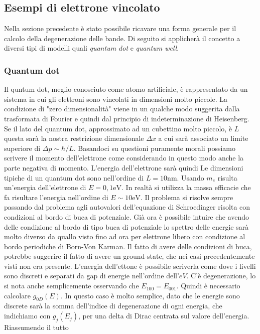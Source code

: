 \documentclass[a4paper,12pt]{article}
\begin{document}
\subsection{Esempi di elettrone vincolato}
Nella sezione precedente è stato possibile ricavare una forma generale per il calcolo della degenerazione delle bande. Di seguito si applicherà il concetto a diversi tipi di modelli quali \textit{quantum dot} e \textit{quantum well}.
\subsubsection{Quantum dot}
Il quntum dot, meglio conosciuto come atomo artificiale, è rappresentato da un sistema in cui gli elettroni sono vincolati in dimensioni molto piccole. La condizione di "zero dimensionalità" viene in un qualche modo suggerita dalla trasformata di Fourier e quindi dal principio di indeterminazione di Heisenberg. Se il lato del quantum dot, approssimato ad un cubettino molto piccolo, è $L$ questa sarà la nostra restrizione dimensionale $\Delta x$ a cui sarà associato un limite superiore di $\Delta p \sim \hbar/L$. Basandoci su questioni puramente morali possiamo scrivere il momento dell'elettrone come 
considerando in questo modo anche la parte negativa di momento. L'energia dell'elettrone sarà quindi
Le dimensioni tipiche di un quantum dot sono nell'ordine di $L=10\text{nm}$. Usando $m_e$ risulta un'energia dell'elettrone di $E=0,1\text{eV}$. In realtà si utilizza la massa efficacie che fa risultare l'energia nell'ordine di $E\sim 10 \text{eV}$. Il problema si risolve sempre passando dal problema agli autovalori dell'equazione di Schroedinger risolta con condizioni al bordo di buca di potenziale. Già ora è possibile intuire che avendo delle condizione al bordo di tipo buca di potenziale lo spettro delle energie sarà molto diverso da quallo visto fino ad ora per elettrone libero con condizione al bordo periodiche di Born-Von Karman. Il fatto di avere delle condizioni di buca, potrebbe suggerire il fatto di avere un ground-state, che nei casi precedentemente visti non era presente. L'energia dell'ettone è possibile scriverla come
dove i livelli sono discreti e separati da gap di energie nell'ordine dell'$eV$. C'è degenerazione, lo si nota anche semplicemente osservando che $E_{100} = E_{001}$. Quindi è necessario calcolare $g_{0D}(E)$. In questo caso è molto semplice, dato che le energie sono discrete sarà la somma dell'indice di degenerazione di ogni energia, che indichiamo con $g_j(E_j)$, per una delta di Dirac centrata sul valore dell'energia. Riassumendo il tutto
\end{document}
